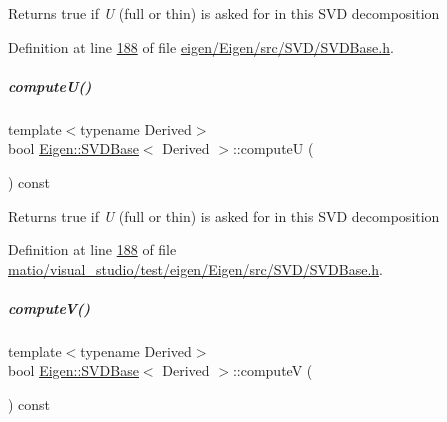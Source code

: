 \begin{DoxyReturn}{Returns}
true if {\itshape U} (full or thin) is asked for in this S\+VD decomposition 
\end{DoxyReturn}


Definition at line \hyperlink{eigen_2_eigen_2src_2_s_v_d_2_s_v_d_base_8h_source_l00188}{188} of file \hyperlink{eigen_2_eigen_2src_2_s_v_d_2_s_v_d_base_8h_source}{eigen/\+Eigen/src/\+S\+V\+D/\+S\+V\+D\+Base.\+h}.

\mbox{\label{group___s_v_d___module_a705a7c2709e1624ccc19aa748a78d473}} 
\subparagraph{\texorpdfstring{compute\+U()}{computeU()}\hspace{0.1cm}{\footnotesize\ttfamily [2/2]}}
{\footnotesize\ttfamily template$<$typename Derived$>$ \\
bool \hyperlink{group___s_v_d___module_class_eigen_1_1_s_v_d_base}{Eigen\+::\+S\+V\+D\+Base}$<$ Derived $>$\+::computeU (\begin{DoxyParamCaption}{ }\end{DoxyParamCaption}) const\hspace{0.3cm}{\ttfamily [inline]}}

\begin{DoxyReturn}{Returns}
true if {\itshape U} (full or thin) is asked for in this S\+VD decomposition 
\end{DoxyReturn}


Definition at line \hyperlink{matio_2visual__studio_2test_2eigen_2_eigen_2src_2_s_v_d_2_s_v_d_base_8h_source_l00188}{188} of file \hyperlink{matio_2visual__studio_2test_2eigen_2_eigen_2src_2_s_v_d_2_s_v_d_base_8h_source}{matio/visual\+\_\+studio/test/eigen/\+Eigen/src/\+S\+V\+D/\+S\+V\+D\+Base.\+h}.

\mbox{\label{group___s_v_d___module_a5f12efcb791eb007d4a4890ac5255ac4}} 
\subparagraph{\texorpdfstring{compute\+V()}{computeV()}\hspace{0.1cm}{\footnotesize\ttfamily [1/2]}}
{\footnotesize\ttfamily template$<$typename Derived$>$ \\
bool \hyperlink{group___s_v_d___module_class_eigen_1_1_s_v_d_base}{Eigen\+::\+S\+V\+D\+Base}$<$ Derived $>$\+::computeV (\begin{DoxyParamCaption}{ }\end{DoxyParamCaption}) const\hspace{0.3cm}{\ttfamily [inline]}}


